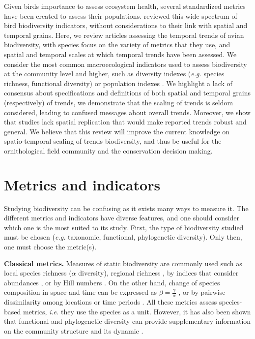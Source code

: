 \documentclass[
  12pt,
  oneside]{report}
\begin{document}
Given birds importance to assess ecosystem health, several standardized metrics have been created to assess their populations. \textcite{fraixedas_state_2020} reviewed this wide spectrum of bird biodiversity indicators, without considerations to their link with spatial and temporal grains. Here, we review articles assessing the temporal trends of avian biodiversity, with species focus on the variety of metrics that they use, and spatial and temporal scales at which temporal trends have been assessed. We consider the most common macroecological indicators used to assess biodiversity at the community level and higher, such as diversity indexes (\emph{e.g.} species richness, functional diversity) or population indexes \autocite{mcgill_fifteen_2015}. We highlight a lack of consensus about specifications and definitions of both spatial and temporal grains (respectively) of trends, we demonstrate that the scaling of trends is seldom considered, leading to confused messages about overall trends. Moreover, we show that studies lack spatial replication that would make reported trends robust and general. We believe that this review will improve the current knowledge on spatio-temporal scaling of trends biodiversity, and thus be useful for the ornithological field community and the conservation decision making.

\hypertarget{metrics-and-indicators}{%
\chapter{Metrics and indicators}\label{metrics-and-indicators}}

Studying biodiversity can be confusing as it exists many ways to measure it. The different metrics and indicators have diverse features, and one should consider which one is the most suited to its study. First, the type of biodiversity studied must be chosen (\emph{e.g.} taxonomic, functional, phylogenetic diversity). Only then, one must choose the metric(s).

\textbf{Classical metrics.} Measures of static biodiversity are commonly used such as local species richness (\(\alpha\) diversity), regional richness \autocite[\(\gamma\) diversity,][]{whittaker_vegetation_1960}, by indices that consider abundances \autocites[\emph{e.g.}][]{shannon_mathematical_1948,simpson_measurement_1949}, or by Hill numbers \autocite{hill_diversity_1973}. On the other hand, change of species composition in space and time can be expressed as \(\beta = \frac{\gamma}{\alpha}\) \autocite{whittaker_evolution_1972}, or by pairwise dissimilarity among locations or time periods \autocite{koleff_measuring_2003}. All these metrics assess species-based metrics, \emph{i.e.} they use the species as a unit. However, it has also been shown that functional and phylogenetic diversity can provide supplementary information on the community structure and its dynamic \autocites[\emph{e.g.}][]{mcgill_rebuilding_2006,mouquet_ecophylogenetics_2012,webb_phylogenies_2002}.
\end{document}
